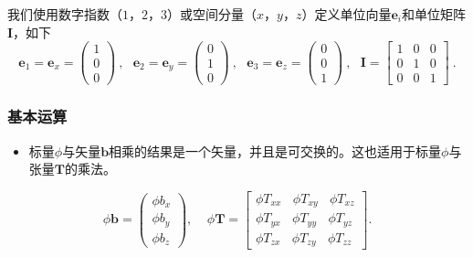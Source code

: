 \documentclass[LBMDerivation.tex]{subfiles}
\begin{document}
	我们使用数字指数（$1$，$2$，$3$）或空间分量（$x$，$y$，$z$）定义单位向量$\textbf{e}_i$和单位矩阵$\textbf{I}$，如下
%
%
\begin{equation*}
\textbf{e}_1 = \textbf{e}_x = \left( \begin{matrix}   1 \\ 0 \\ 0  \end{matrix}  \right)
~,~~~
\textbf{e}_2= \textbf{e}_y = \left( \begin{matrix}   0 \\ 1 \\ 0  \end{matrix}  \right)
~,~~~
\textbf{e}_3= \textbf{e}_z = \left( \begin{matrix}   0 \\ 0 \\ 1  \end{matrix}  \right)
~,~~~
\textbf{I} = \left[ \begin{matrix}   1 & 0 & 0 \\ 0 & 1 & 0 \\ 0 & 0 & 1  \end{matrix}  \right] ~.
\end{equation*}
%
%
%
\subsubsection{基本运算}
%
%
\begin{itemize}
    \item 标量$\phi$与矢量$\textbf{b}$相乘的结果是一个矢量，并且是可交换的。这也适用于标量$\phi$与张量$\textbf{T}$的乘法。
\end{itemize}
%
%
\begin{equation}
  \phi \textbf{b} =
  \left(
  \begin{matrix}
    \phi b_x \\ \phi b_y \\ \phi b_z
  \end{matrix}
  \right)
  ,~~~~~
  \phi\textbf{T}
=
  \left[
  \begin{matrix}
   \phi T_{xx} ~ ~ ~ ~ \phi T_{xy} ~ ~ ~ ~ \phi T_{xz} \\
   \phi T_{yx} ~ ~ ~ ~ \phi T_{yy} ~ ~ ~ ~ \phi T_{yz} \\
   \phi T_{zx} ~ ~ ~ ~ \phi T_{zy} ~ ~ ~ ~ \phi T_{zz}
  \end{matrix}
  \right].
\label{EQUATION::simple}
\end{equation}
%
%
%
%
\end{document}
